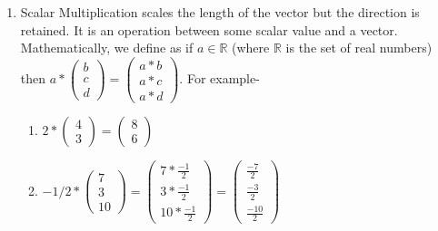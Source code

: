 \documentclass{article}
\begin{document}
\begin{enumerate}
\item Scalar Multiplication scales the length of the vector but the  direction is retained. It is an operation between some scalar value and a vector. Mathematically, we define as if $a\in \mathbb{R}$ (where $\mathbb{R}$ is the set of real numbers) then
$a*\begin{pmatrix}
b\\c\\d

\end{pmatrix}=
\begin{pmatrix}
a*b\\a*c\\a*d
\end{pmatrix}$. For example-
\begin{enumerate}
    \item $2*\begin{pmatrix}
4\\
3
\end{pmatrix}=
\begin{pmatrix}
8\\
6
\end{pmatrix}$\\

\item $-1/2*\begin{pmatrix}
7\\3\\10
\end{pmatrix}=
\begin{pmatrix}
7*\frac{-1}{2}\\3*\frac{-1}{2}\\10*\frac{-1}{2}
\end{pmatrix}=
\begin{pmatrix}
\frac{-7}{2}\\\frac{-3}{2}\\\frac{-10}{2}
\end{pmatrix}$\\

\end{enumerate}
\end{enumerate}
\end{document}
